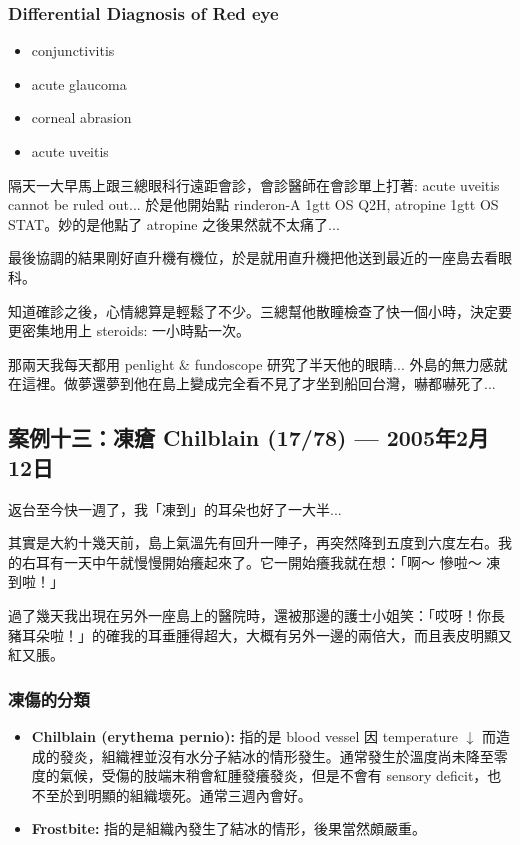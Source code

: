 \documentclass[12pt,a4paper]{article}
\newenvironment{myquote}{%
    \begin{tcolorbox}[
        colback=quote_bg,
        colframe=emergency_gray,
        boxrule=0pt,
        leftrule=3pt,
        arc=0pt,
        left=10pt,
        right=10pt,
        top=8pt,
        bottom=8pt
    ]
    \itshape
}{%
    \end{tcolorbox}
}
\begin{document}
\subsubsection{Differential Diagnosis of Red eye}

\begin{itemize}
    \item conjunctivitis
    \item acute glaucoma
    \item corneal abrasion
    \item acute uveitis
\end{itemize}

隔天一大早馬上跟三總眼科行遠距會診，會診醫師在會診單上打著: acute uveitis cannot be ruled out... 於是他開始點 rinderon-A 1gtt OS Q2H, atropine 1gtt OS STAT。妙的是他點了 atropine 之後果然就不太痛了...

最後協調的結果剛好直升機有機位，於是就用直升機把他送到最近的一座島去看眼科。

知道確診之後，心情總算是輕鬆了不少。三總幫他散瞳檢查了快一個小時，決定要更密集地用上 steroids: 一小時點一次。

\begin{myquote}
那兩天我每天都用 penlight \& fundoscope 研究了半天他的眼睛... 外島的無力感就在這裡。做夢還夢到他在島上變成完全看不見了才坐到船回台灣，嚇都嚇死了...
\end{myquote}

\subsection{案例十三：凍瘡 Chilblain (17/78) — 2005年2月12日}

返台至今快一週了，我「凍到」的耳朵也好了一大半...

其實是大約十幾天前，島上氣溫先有回升一陣子，再突然降到五度到六度左右。我的右耳有一天中午就慢慢開始癢起來了。它一開始癢我就在想：「啊～ 慘啦～ 凍到啦！」

過了幾天我出現在另外一座島上的醫院時，還被那邊的護士小姐笑：「哎呀！你長豬耳朵啦！」的確我的耳垂腫得超大，大概有另外一邊的兩倍大，而且表皮明顯又紅又脹。

\subsubsection{凍傷的分類}

\begin{itemize}
    \item \textbf{Chilblain (erythema pernio):} 指的是 blood vessel 因 temperature $\downarrow$ 而造成的發炎，組織裡並沒有水分子結冰的情形發生。通常發生於溫度尚未降至零度的氣候，受傷的肢端末稍會紅腫發癢發炎，但是不會有 sensory deficit，也不至於到明顯的組織壞死。通常三週內會好。

    \item \textbf{Frostbite:} 指的是組織內發生了結冰的情形，後果當然頗嚴重。
\end{itemize}
\end{document}
